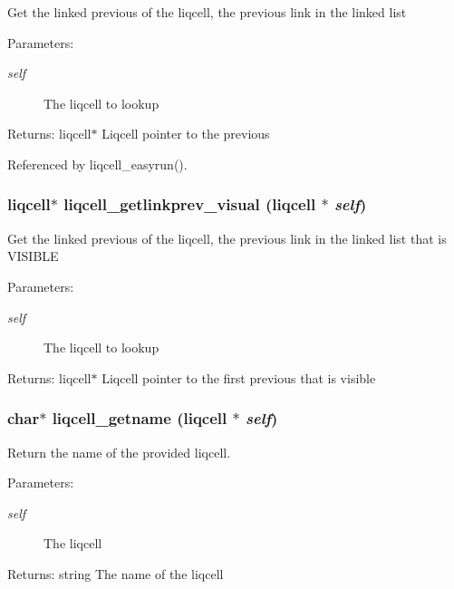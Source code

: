 Get the linked previous of the liqcell, the previous link in the linked list \begin{Desc}
\item[Parameters:]
\begin{description}
\item[{\em self}]The liqcell to lookup \end{description}
\end{Desc}
\begin{Desc}
\item[Returns:]liqcell$\ast$ Liqcell pointer to the previous \end{Desc}


Referenced by liqcell\_\-easyrun().
\subsubsection[{liqcell\_\-getlinkprev\_\-visual}]{\setlength{\rightskip}{0pt plus 5cm}liqcell$\ast$ liqcell\_\-getlinkprev\_\-visual (liqcell $\ast$ {\em self})}\label{d5/da2/liqcell_8c_0a4fb59d363ceadf8864834123c2a622}


Get the linked previous of the liqcell, the previous link in the linked list that is VISIBLE \begin{Desc}
\item[Parameters:]
\begin{description}
\item[{\em self}]The liqcell to lookup \end{description}
\end{Desc}
\begin{Desc}
\item[Returns:]liqcell$\ast$ Liqcell pointer to the first previous that is visible \end{Desc}
\subsubsection[{liqcell\_\-getname}]{\setlength{\rightskip}{0pt plus 5cm}char$\ast$ liqcell\_\-getname (liqcell $\ast$ {\em self})}\label{d5/da2/liqcell_8c_2a3dd9758326dbce471df3ef1bd98711}


Return the name of the provided liqcell. \begin{Desc}
\item[Parameters:]
\begin{description}
\item[{\em self}]The liqcell \end{description}
\end{Desc}
\begin{Desc}
\item[Returns:]string The name of the liqcell \end{Desc}


